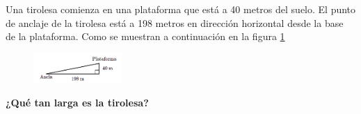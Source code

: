Una tirolesa comienza en una plataforma que está a 40 metros del suelo.
El punto de anclaje de la tirolesa está a 198 metros en dirección horizontal desde la base de la plataforma.
Como se muestran a continuación en la figura \ref{fig:proverb_pitagoras_03}
\begin{figure}[H]
    \begin{center}
        \includegraphics[width=0.3\textwidth]{../images/proverb_pitagoras_03.png}
    \end{center}
    \caption{}
    \label{fig:proverb_pitagoras_03}
\end{figure}
\textbf{¿Qué tan larga es la tirolesa?}